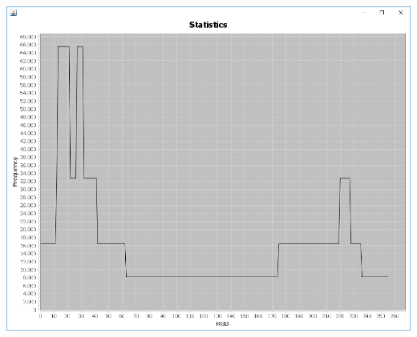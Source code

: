 \documentclass[a4paper,12pt]{article}
\begin{document}
\begin{center}
\includegraphics[width=0.8\linewidth,height=0.7\textheight]{Normalization/normalizedPowerOfTwo}
\end{center}
\newpage
\end{document}

